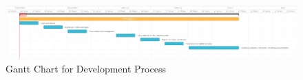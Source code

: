 \begin{figure}
\begin{center}
\includegraphics[width=15cm]{figures/agile_gantt}
\end{center}
\caption{Gantt Chart for Development Process}
\label{fig:agile_gantt}
\end{figure}
